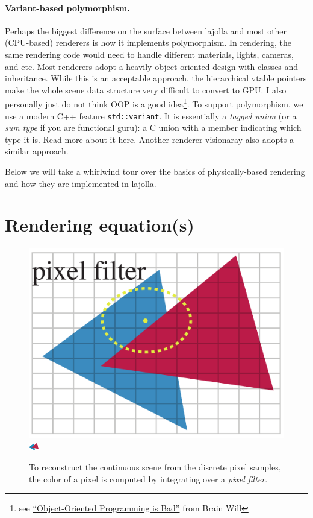 \paragraph{Variant-based polymorphism.} Perhaps the biggest difference on the surface between lajolla and most other (CPU-based) renderers is how it implements polymorphism. In rendering, the same rendering code would need to handle different materials, lights, cameras, and etc. Most renderers adopt a heavily object-oriented design with classes and inheritance. While this is an acceptable approach, the hierarchical vtable pointers make the whole scene data structure very difficult to convert to GPU. I also personally just do not think OOP is a good idea\footnote{see \href{https://www.youtube.com/watch?v=QM1iUe6IofM}{``Object-Oriented Programming is Bad''} from Brain Will}. To support polymorphism, we use a modern C++ feature \lstinline{std::variant}. It is essentially a \emph{tagged union} (or a \emph{sum type} if you are functional guru): a C union with a member indicating which type it is. Read more about it \href{https://www.cppstories.com/2020/04/variant-virtual-polymorphism.html/}{here}. Another renderer \href{https://github.com/szellmann/visionaray}{visionaray} also adopts a similar approach.

Below we will take a whirlwind tour over the basics of physically-based rendering and how they are implemented in lajolla.

\section{Rendering equation(s)}
\begin{figure}[h]
    \centering
    \includegraphics[width=0.4\linewidth]{imgs/pixel_filter.pdf}
    \includegraphics[width=0.4\linewidth]{imgs/antialiasing.pdf}
    \caption{To reconstruct the continuous scene from the discrete pixel samples, the color of a pixel is computed by integrating over a \emph{pixel filter}.}
    \label{fig:pixel_filter}
\end{figure}

